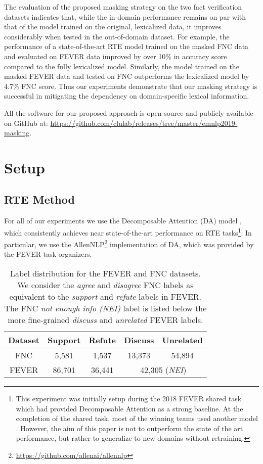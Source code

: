 \documentclass[11pt,a4paper]{article}
\begin{document}
{}  The evaluation of the proposed masking strategy on the two fact verification datasets indicates that,
while the in-domain performance remains on par with that of the model trained on the original, lexicalized data, it improves considerably when tested in the out-of-domain dataset. 
For example, the performance of a state-of-the-art RTE model trained on the masked FNC data and evaluated on FEVER data improved by over 10\% in accuracy score compared to the fully lexicalized model. Similarly, the model trained on the masked FEVER data and tested on FNC outperforms the lexicalized model by 4.7\% FNC score.
Thus our experiments demonstrate that our masking strategy is successful in mitigating the dependency on domain-specific lexical information.

All the software for our proposed approach is open-source and publicly available on GitHub at: \url{https://github.com/clulab/releases/tree/master/emnlp2019-masking}.



\section{Setup}


\subsection{RTE Method}
For all of our experiments we use the Decomposable Attention (DA) model \cite{parikh2016decomposable}, which consistently achieves near state-of-the-art performance on RTE tasks\footnote{This experiment was initially setup during the 2018 FEVER shared task which had provided Decomposable Attention as a strong baseline. At the completion of the shared task, most of the winning teams used another model \cite{chen2016enhanced}. However, the aim of this paper is not to outperform the state of the art performance, but rather to generalize to new domains without retraining.}. In particular, we use the AllenNLP\footnote{\url{https://github.com/allenai/allennlp}}
implementation of DA, which was provided by the FEVER task organizers.  

\begin{table}
    \centering
    \footnotesize
    \begin{tabular}{ccccc}
        Dataset & Support & Refute & Discuss & Unrelated \\
        \hline
        FNC    & 5,581 & 1,537  & 13,373 & 54,894 \\
        FEVER  &  86,701 & 36,441  & \multicolumn{2}{c}{42,305 (\textit{NEI})} \\  
    \end{tabular}
    \caption{Label distribution for the FEVER and FNC datasets.  We consider the \textit{agree} and \textit{disagree} FNC labels as equivalent to the \textit{support} and \textit{refute} labels in FEVER. The FNC \textit{not enough info (NEI)} label is listed below the more fine-grained \textit{discuss} and \textit{unrelated} FEVER labels.  }
    \label{tab:data}
\end{table}
\end{document}
